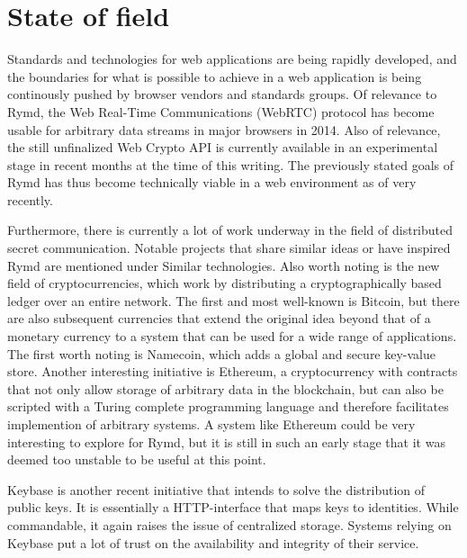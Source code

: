 \section{State of field}
Standards and technologies for web applications are being rapidly developed, and the boundaries for what is possible to achieve in a web application is being continously pushed by browser vendors and standards groups. Of relevance to Rymd, the Web Real-Time Communications (WebRTC) protocol has become usable for arbitrary data streams in major browsers in 2014. Also of relevance, the still unfinalized Web Crypto API is currently available in an experimental stage in recent months at the time of this writing. The previously stated goals of Rymd has thus become technically viable in a web environment as of very recently.

Furthermore, there is currently a lot of work underway in the field of distributed secret communication. Notable projects that share similar ideas or have inspired Rymd are mentioned under Similar technologies. Also worth noting is the new field of cryptocurrencies, which work by distributing a cryptographically based ledger over an entire network. The first and most well-known is Bitcoin, but there are also subsequent currencies that extend the original idea beyond that of a monetary currency to a system that can be used for a wide range of applications. The first worth noting is Namecoin, which adds a global and secure key-value store. Another interesting initiative is Ethereum, a cryptocurrency with contracts that not only allow storage of arbitrary data in the blockchain, but can also be scripted with a Turing complete programming language and therefore facilitates implemention of arbitrary systems. A system like Ethereum could be very interesting to explore for Rymd, but it is still in such an early stage that it was deemed too unstable to be useful at this point.

Keybase is another recent initiative that intends to solve the distribution of public keys. It is essentially a HTTP-interface that maps keys to identities. While commandable, it again raises the issue of centralized storage. Systems relying on Keybase put a lot of trust on the availability and integrity of their service.

